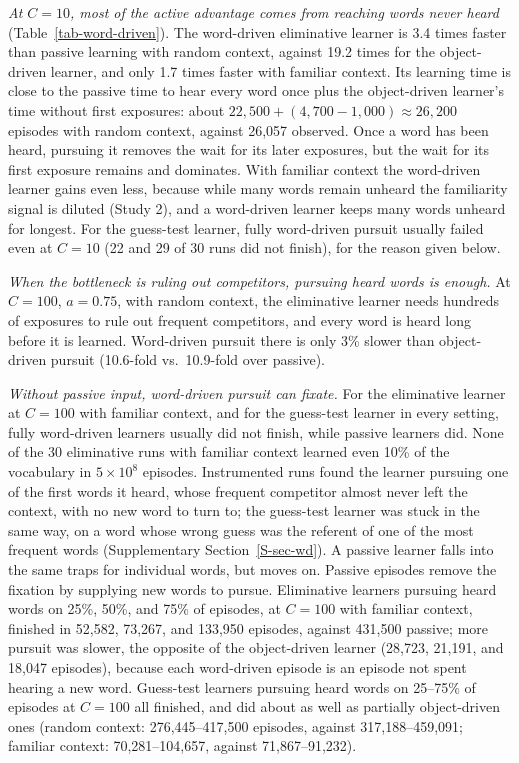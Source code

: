 \documentclass[a4paper,natbib,man]{apa6}
\begin{document}
\textit{At $C=10$, most of the active advantage comes from reaching words never heard} (Table~\ref{tab-word-driven}). The word-driven eliminative learner is 3.4 times faster than passive learning with random context, against 19.2 times for the object-driven learner, and only 1.7 times faster with familiar context. Its learning time is close to the passive time to hear every word once plus the object-driven learner's time without first exposures: about $22{,}500 + (4{,}700 - 1{,}000) \approx 26{,}200$ episodes with random context, against 26,057 observed. Once a word has been heard, pursuing it removes the wait for its later exposures, but the wait for its first exposure remains and dominates. With familiar context the word-driven learner gains even less, because while many words remain unheard the familiarity signal is diluted (Study 2), and a word-driven learner keeps many words unheard for longest. For the guess-test learner, fully word-driven pursuit usually failed even at $C=10$ (22 and 29 of 30 runs did not finish), for the reason given below.

\textit{When the bottleneck is ruling out competitors, pursuing heard words is enough.} At $C=100$, $a=0.75$, with random context, the eliminative learner needs hundreds of exposures to rule out frequent competitors, and every word is heard long before it is learned. Word-driven pursuit there is only 3\% slower than object-driven pursuit (10.6-fold vs.\ 10.9-fold over passive).

\textit{Without passive input, word-driven pursuit can fixate.} For the eliminative learner at $C=100$ with familiar context, and for the guess-test learner in every setting, fully word-driven learners usually did not finish, while passive learners did. None of the 30 eliminative runs with familiar context learned even 10\% of the vocabulary in $5 \times 10^8$ episodes. Instrumented runs found the learner pursuing one of the first words it heard, whose frequent competitor almost never left the context, with no new word to turn to; the guess-test learner was stuck in the same way, on a word whose wrong guess was the referent of one of the most frequent words (Supplementary Section~\ref{S-sec-wd}). A passive learner falls into the same traps for individual words, but moves on. Passive episodes remove the fixation by supplying new words to pursue. Eliminative learners pursuing heard words on 25\%, 50\%, and 75\% of episodes, at $C=100$ with familiar context, finished in 52,582, 73,267, and 133,950 episodes, against 431,500 passive; more pursuit was slower, the opposite of the object-driven learner (28,723, 21,191, and 18,047 episodes), because each word-driven episode is an episode not spent hearing a new word. Guess-test learners pursuing heard words on 25--75\% of episodes at $C=100$ all finished, and did about as well as partially object-driven ones (random context: 276,445--417,500 episodes, against 317,188--459,091; familiar context: 70,281--104,657, against 71,867--91,232).
\end{document}
